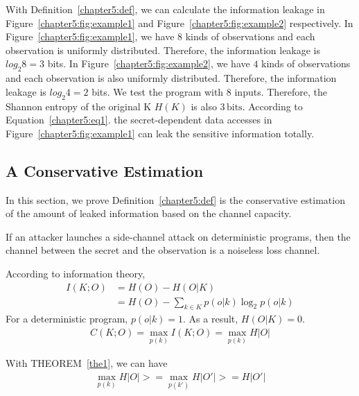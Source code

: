 With Definition~\ref{chapter5:def}, we can calculate the information leakage in Figure~\ref{chapter5:fig:example1} and Figure~\ref{chapter5:fig:example2} respectively. In Figure~\ref{chapter5:fig:example1}, we have $8$ kinds of observations and each observation is uniformly distributed. Therefore, the information leakage is $log_2{8} = 3$ bits. In Figure~\ref{chapter5:fig:example2}, we have $4$ kinds of observations and each observation is also uniformly distributed. Therefore, the information leakage is $log_2{4} = 2$ bits. We test the program with $8$ inputs. Therefore, the Shannon entropy of the original K $H(K)$ is also $3\,\mathrm{bits}$. According to Equation~\ref{chapter5:eq1}. the secret-dependent data accesses in Figure~\ref{chapter5:fig:example1} can leak the sensitive information totally.

\subsection{A Conservative Estimation}
In this section, we prove Definition~\ref{chapter5:def} is the conservative estimation of the amount of leaked information based on the channel capacity.

\begin{theorem}\label{the1}
  If an attacker launches a side-channel attack on  deterministic programs, then the channel between the secret and the observation is a noiseless loss channel.
\end{theorem}

\begin{myprof}
  According to information theory,
  \begin{align*}
    I(K;O) & = H(O) - H(O|K)                                \\
           & = H(O) - \sum_{k {\in} K }{p(o|k)\log_2p(o|k)}
  \end{align*}
  For a deterministic program, $p(o|k)=1$. As a result, $H(O|K) = 0$.
  \begin{align*}
    C(K;O) = \max_{p(k)} I(K;O) = \max_{p(k)} H |O|
  \end{align*}
\end{myprof}

With THEOREM~\ref{the1}, we can have
\begin{align*}
  \max_{p(k)} H |O| >= \max_{p(k')} H |O'| >= H |O'|
\end{align*}

